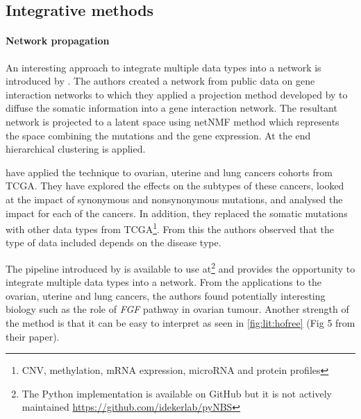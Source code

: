 \subsection{Integrative methods} \label{s:lit:net_data_int}

\vspace{3mm}
\vspace{3mm}


\paragraph*{Network propagation} \label{s:lit:net_prop}

An interesting approach to integrate multiple data types into a network is introduced by  \citet{Hofree2013-ld}. The authors created a network from public data on gene interaction networks \citep{Szklarczyk2019-pu, Cerami2011-ql, Lee2011-xj} to which they applied a projection method developed by \citet{Vanunu2010-el} to diffuse the somatic information into a gene interaction network. The resultant network is projected to a latent space using netNMF method \citep{Cai2008-fv} which represents the space combining the mutations and the gene expression. At the end hierarchical clustering is applied.

\citet{Hofree2013-ld} have applied the technique to ovarian, uterine and lung cancers cohorts from TCGA. They have explored the effects on the subtypes of these cancers, looked at the impact of synonymous and nonsynonymous mutations, and analysed the impact for each of the cancers. In addition, they replaced the somatic mutations with other data types from TCGA\footnote{CNV, methylation, mRNA expression, microRNA and protein profiles}. From this the authors observed that the type of data included depends on the disease type.

The pipeline introduced by \citet{Hofree2013-ld} is available to use at\footnote{The Python implementation is available on GitHub but it is not actively maintained \url{https://github.com/idekerlab/pyNBS}} and provides the opportunity to integrate multiple data types into a network. From the applications to the ovarian, uterine and lung cancers, the authors found potentially interesting biology such as the role of \textit{FGF} pathway in ovarian tumour. Another strength of the method is that it can be easy to interpret as seen in \cref{fig:lit:hofree} (Fig 5 from their paper).

